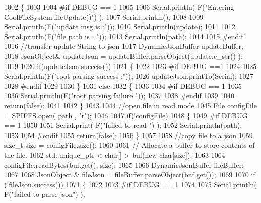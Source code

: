 \begin{DoxyCode}
1002 \{
1003 
1004 \textcolor{preprocessor}{#if DEBUG == 1}
1005 
1006     Serial.println( F(\textcolor{stringliteral}{"Entering CoolFileSystem.fileUpdate()"}) );
1007     Serial.println();
1008     
1009     Serial.println(F(\textcolor{stringliteral}{"update msg is :"}));
1010     Serial.println(update);
1011     
1012     Serial.println(F(\textcolor{stringliteral}{"file path is : "}));
1013     Serial.println(path);   
1014 
1015 \textcolor{preprocessor}{#endif}
1016     \textcolor{comment}{//transfer update String to json}
1017     DynamicJsonBuffer updateBuffer;
1018     JsonObject& updateJson = updateBuffer.parseObject(update.c\_str() );
1019     
1020     \textcolor{keywordflow}{if}(updateJson.success())
1021     \{
1022     
1023 \textcolor{preprocessor}{    #if DEBUG ==1}
1024         
1025         Serial.println(F(\textcolor{stringliteral}{"root parsing success :"}));
1026         updateJson.printTo(Serial);
1027     
1028 \textcolor{preprocessor}{    #endif}
1029 
1030     \}
1031     \textcolor{keywordflow}{else}
1032     \{
1033     
1034 \textcolor{preprocessor}{    #if DEBUG == 1 }
1035     
1036         Serial.println(F(\textcolor{stringliteral}{"root parsing failure "}));
1037     
1038 \textcolor{preprocessor}{    #endif}
1039         
1040         \textcolor{keywordflow}{return}(\textcolor{keyword}{false});  
1041 
1042     \}
1043     
1044     \textcolor{comment}{//open file in read mode}
1045     File configFile = SPIFFS.open( path , \textcolor{stringliteral}{"r"});
1046     
1047     \textcolor{keywordflow}{if}(!configFile)
1048     \{   
1049 \textcolor{preprocessor}{    #if DEBUG == 1}
1050         
1051         Serial.print( F(\textcolor{stringliteral}{"failed to read "}) );
1052         Serial.println(path);
1053 
1054 \textcolor{preprocessor}{    #endif}
1055         \textcolor{keywordflow}{return}(\textcolor{keyword}{false});
1056     \}
1057 
1058     \textcolor{comment}{//copy file to a json}
1059     \textcolor{keywordtype}{size\_t} size = configFile.size();
1060 
1061     \textcolor{comment}{// Allocate a buffer to store contents of the file.}
1062     std::unique\_ptr < char[] > buf(\textcolor{keyword}{new} \textcolor{keywordtype}{char}[size]);
1063 
1064     configFile.readBytes(buf.get(), size);
1065 
1066     DynamicJsonBuffer fileBuffer;
1067 
1068     JsonObject & fileJson = fileBuffer.parseObject(buf.get());
1069 
1070     \textcolor{keywordflow}{if} (!fileJson.success())
1071     \{
1072 
1073 \textcolor{preprocessor}{    #if DEBUG == 1}
1074 
1075         Serial.println( F(\textcolor{stringliteral}{"failed to parse json"}) );

\end{DoxyCode}
